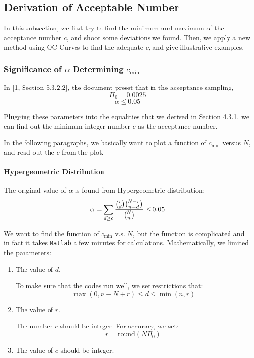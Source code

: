 \documentclass[a4paper]{article}
\begin{document}
\subsection{Derivation of Acceptable Number}
In this subsection, we first try to find the minimum and maximum of the acceptance number $c$, and shoot some deviations we found. Then, we apply a new method using OC Curves to find the adequate $c$, and give illustrative examples.

\subsubsection{Significance of $\alpha$ Determining $c_{\min}$}
In [1, Section 5.3.2.2], the document preset that in the acceptance sampling,
$$\Pi_0 = 0.0025$$
$$\alpha \leq 0.05$$

Plugging these parameters into the equalities that we derived in Section 4.3.1, we can find out the minimum integer number $c$ as the acceptance number.

In the following paragraphs, we basically want to plot a function of $c_{\min}$ versus $N$, and read out the $c$ from the plot.

\paragraph{Hypergeometric Distribution}
The original value of $\alpha$ is found from Hypergeometric distribution:
$$\alpha = \sum_{d\geq c} \displaystyle\frac{\tbinom{r}{d}\tbinom{N-r}{n-d}}{\tbinom{N}{n}}\leq 0.05$$

We want to find the function of $c_{\min}$ v.s. $N$, but the function is complicated and in fact it takes \texttt{Matlab} a few minutes for calculations. Mathematically, we limited the parameters:
\begin{enumerate}
\item The value of $d$.

To make sure that the codes run well, we set restrictions that:
$$\max(0,n-N+r)\leq d \leq \min(n,r)$$
\item The value of $r$.

The number $r$ should be integer. For accuracy, we set:
$$r = \text{round}(N\Pi_0)$$

\item The value of $c$ should be integer.
\end{enumerate}

\newpage
\end{document}
